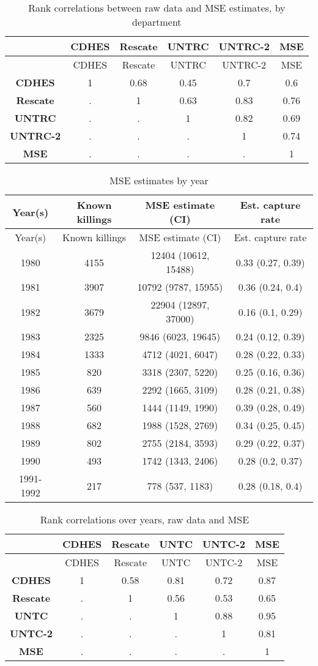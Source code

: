 \documentclass[11pt,]{article}
\begin{document}
\scriptsize

\begin{longtable}[]{@{}cccccc@{}}
\caption{Rank correlations between raw data and MSE estimates, by
department}\tabularnewline
\toprule
~ & CDHES & Rescate & UNTRC & UNTRC-2 & MSE\tabularnewline
\midrule
\endfirsthead
\toprule
~ & CDHES & Rescate & UNTRC & UNTRC-2 & MSE\tabularnewline
\midrule
\endhead
\textbf{CDHES} & 1 & 0.68 & 0.45 & 0.7 & 0.6\tabularnewline
\textbf{Rescate} & . & 1 & 0.63 & 0.83 & 0.76\tabularnewline
\textbf{UNTRC} & . & . & 1 & 0.82 & 0.69\tabularnewline
\textbf{UNTRC-2} & . & . & . & 1 & 0.74\tabularnewline
\textbf{MSE} & . & . & . & . & 1\tabularnewline
\bottomrule
\end{longtable}

\pagebreak

\begin{longtable}[]{@{}cccc@{}}
\caption{MSE estimates by year}\tabularnewline
\toprule
Year(s) & Known killings & MSE estimate (CI) & Est. capture
rate\tabularnewline
\midrule
\endfirsthead
\toprule
Year(s) & Known killings & MSE estimate (CI) & Est. capture
rate\tabularnewline
\midrule
\endhead
1980 & 4155 & 12404 (10612, 15488) & 0.33 (0.27, 0.39)\tabularnewline
1981 & 3907 & 10792 (9787, 15955) & 0.36 (0.24, 0.4)\tabularnewline
1982 & 3679 & 22904 (12897, 37000) & 0.16 (0.1, 0.29)\tabularnewline
1983 & 2325 & 9846 (6023, 19645) & 0.24 (0.12, 0.39)\tabularnewline
1984 & 1333 & 4712 (4021, 6047) & 0.28 (0.22, 0.33)\tabularnewline
1985 & 820 & 3318 (2307, 5220) & 0.25 (0.16, 0.36)\tabularnewline
1986 & 639 & 2292 (1665, 3109) & 0.28 (0.21, 0.38)\tabularnewline
1987 & 560 & 1444 (1149, 1990) & 0.39 (0.28, 0.49)\tabularnewline
1988 & 682 & 1988 (1528, 2769) & 0.34 (0.25, 0.45)\tabularnewline
1989 & 802 & 2755 (2184, 3593) & 0.29 (0.22, 0.37)\tabularnewline
1990 & 493 & 1742 (1343, 2406) & 0.28 (0.2, 0.37)\tabularnewline
1991-1992 & 217 & 778 (537, 1183) & 0.28 (0.18, 0.4)\tabularnewline
\bottomrule
\end{longtable}

\begin{longtable}[]{@{}cccccc@{}}
\caption{Rank correlations over years, raw data and MSE}\tabularnewline
\toprule
~ & CDHES & Rescate & UNTC & UNTC-2 & MSE\tabularnewline
\midrule
\endfirsthead
\toprule
~ & CDHES & Rescate & UNTC & UNTC-2 & MSE\tabularnewline
\midrule
\endhead
\textbf{CDHES} & 1 & 0.58 & 0.81 & 0.72 & 0.87\tabularnewline
\textbf{Rescate} & . & 1 & 0.56 & 0.53 & 0.65\tabularnewline
\textbf{UNTC} & . & . & 1 & 0.88 & 0.95\tabularnewline
\textbf{UNTC-2} & . & . & . & 1 & 0.81\tabularnewline
\textbf{MSE} & . & . & . & . & 1\tabularnewline
\bottomrule
\end{longtable}
\end{document}
